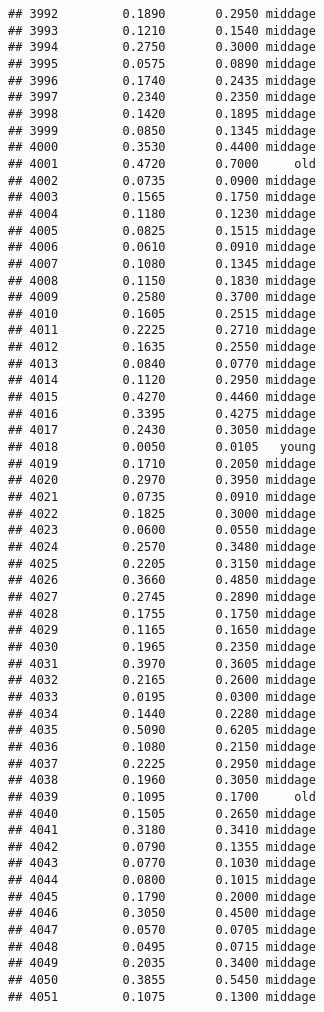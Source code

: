 \documentclass[
]{article}
\begin{document}
\begin{verbatim}
## 3992         0.1890       0.2950 middage
## 3993         0.1210       0.1540 middage
## 3994         0.2750       0.3000 middage
## 3995         0.0575       0.0890 middage
## 3996         0.1740       0.2435 middage
## 3997         0.2340       0.2350 middage
## 3998         0.1420       0.1895 middage
## 3999         0.0850       0.1345 middage
## 4000         0.3530       0.4400 middage
## 4001         0.4720       0.7000     old
## 4002         0.0735       0.0900 middage
## 4003         0.1565       0.1750 middage
## 4004         0.1180       0.1230 middage
## 4005         0.0825       0.1515 middage
## 4006         0.0610       0.0910 middage
## 4007         0.1080       0.1345 middage
## 4008         0.1150       0.1830 middage
## 4009         0.2580       0.3700 middage
## 4010         0.1605       0.2515 middage
## 4011         0.2225       0.2710 middage
## 4012         0.1635       0.2550 middage
## 4013         0.0840       0.0770 middage
## 4014         0.1120       0.2950 middage
## 4015         0.4270       0.4460 middage
## 4016         0.3395       0.4275 middage
## 4017         0.2430       0.3050 middage
## 4018         0.0050       0.0105   young
## 4019         0.1710       0.2050 middage
## 4020         0.2970       0.3950 middage
## 4021         0.0735       0.0910 middage
## 4022         0.1825       0.3000 middage
## 4023         0.0600       0.0550 middage
## 4024         0.2570       0.3480 middage
## 4025         0.2205       0.3150 middage
## 4026         0.3660       0.4850 middage
## 4027         0.2745       0.2890 middage
## 4028         0.1755       0.1750 middage
## 4029         0.1165       0.1650 middage
## 4030         0.1965       0.2350 middage
## 4031         0.3970       0.3605 middage
## 4032         0.2165       0.2600 middage
## 4033         0.0195       0.0300 middage
## 4034         0.1440       0.2280 middage
## 4035         0.5090       0.6205 middage
## 4036         0.1080       0.2150 middage
## 4037         0.2225       0.2950 middage
## 4038         0.1960       0.3050 middage
## 4039         0.1095       0.1700     old
## 4040         0.1505       0.2650 middage
## 4041         0.3180       0.3410 middage
## 4042         0.0790       0.1355 middage
## 4043         0.0770       0.1030 middage
## 4044         0.0800       0.1015 middage
## 4045         0.1790       0.2000 middage
## 4046         0.3050       0.4500 middage
## 4047         0.0570       0.0705 middage
## 4048         0.0495       0.0715 middage
## 4049         0.2035       0.3400 middage
## 4050         0.3855       0.5450 middage
## 4051         0.1075       0.1300 middage

\end{verbatim}
\end{document}
